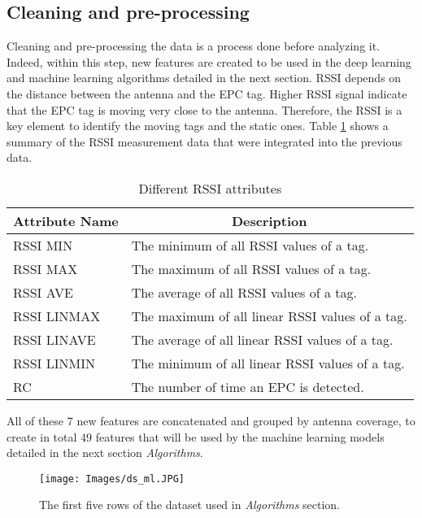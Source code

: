 \documentclass{article}
\begin{document}
\subsection{Cleaning and pre-processing}
Cleaning and pre-processing the data is a process done before analyzing it. Indeed, within this step, new features are created to be used in the deep learning and machine learning algorithms detailed in the next section.
\ac{RSSI} depends on the distance between the antenna and the \ac{EPC} tag.
Higher \ac{RSSI} signal indicate that the \ac{EPC} tag is moving very close to the antenna. 
Therefore, the \ac{RSSI} is a key element to identify the moving tags and the static ones. 
Table \ref{tab:RSSI_attributes} shows a summary of the \ac{RSSI} measurement data that were integrated into the previous data.
%
\begin{table}[h!]
\centering
\setlength{\belowcaptionskip}{7pt}
\caption{Different \ac{RSSI} attributes  }
\label{tab:RSSI_attributes}
\begin{tabular}{@{}ll@{}}
\toprule
\multicolumn{1}{c}{\textbf{Attribute Name}} & \multicolumn{1}{c}{\textbf{Description}} \\ \midrule
\ac{RSSI} MIN       & The minimum of all \ac{RSSI} values of a tag. \\
\ac{RSSI} MAX       & The maximum of all \ac{RSSI} values of a tag.  \\
\ac{RSSI} AVE       & The average of all \ac{RSSI} values of a tag.   \\
\ac{RSSI} LINMAX    & The maximum of all linear \ac{RSSI} values of a tag. \\
\ac{RSSI} LINAVE    & The average of all linear \ac{RSSI} values of a tag.  \\
\ac{RSSI} LINMIN    & The minimum of all linear \ac{RSSI} values of a tag. \\
\ac{RC}          & The number of time an \ac{EPC} is detected.     \\
\bottomrule
\end{tabular}
\end{table}
%

All of these 7 new features are concatenated and grouped by antenna coverage, to create in total 49 features that will be used by the machine learning models detailed in the next section \emph{Algorithms}.
%
\begin{figure}[h]
    \centering
    \texttt{[image: Images/ds\_ml.JPG]}
    \caption{The first five rows of the dataset used in  \emph{Algorithms} section.}
    \label{fig:final_dataset_without_windows}
\end{figure}
%
\end{document}
